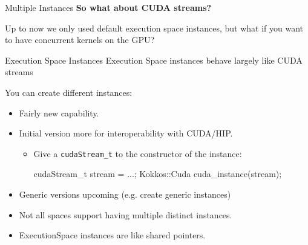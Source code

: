 
\begin{frame}[fragile]{Multiple Instances}
  \textbf{So what about CUDA streams?}

	Up to now we only used default execution space instances, but what if you want to have concurrent kernels on the GPU?

	\pause
	\begin{block}{Execution Space Instances}
		Execution Space instances behave largely like CUDA streams
	\end{block}

	\pause
	You can create different instances:
	\begin{itemize}
		\item Fairly new capability. 
		\item Initial version more for interoperability with CUDA/HIP.
		\begin{itemize}
			\item Give a \texttt{cudaStream\_t} to the constructor of the instance:
				\begin{code}[]
	cudaStream_t stream = ...;
	Kokkos::Cuda cuda_instance(stream);
				\end{code}
		\end{itemize}
		\item Generic versions upcoming (e.g. create generic instances)
		\item Not all spaces support having multiple distinct instances.
		\item ExecutionSpace instances are like shared pointers. 
	\end{itemize}

\end{frame}


